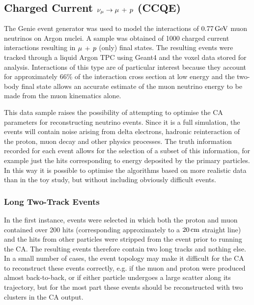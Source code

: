 \subsection{Charged Current \texorpdfstring{$\nu_\mu \rightarrow \mu\,+\,p$}{ν\_μ → μ + p} (CCQE)}
The Genie event generator was used to model the interactions of $0.77\,\mathrm{GeV}$ muon neutrinos on Argon nuclei. A sample was obtained of 1000 charged current interactions resulting in $\mu\,+\,p$ (only) final states. The resulting events were tracked through a liquid Argon TPC using Geant4 and the voxel data stored for analysis. Interactions of this type are of particular interest because they account for approximately 66\% of the interaction cross section at low energy and the two-body final state allows an accurate estimate of the muon neutrino energy to be made from the muon kinematics alone.

This data sample raises the possibility of attempting to optimise the \ac{CA} parameters for reconstructing neutrino events. Since it is a full simulation, the events will contain noise arising from delta electrons, hadronic reinteraction of the proton, muon decay and other physics processes. The truth information recorded for each event allows for the selection of a subset of this information, for example just the hits corresponding to energy deposited by the primary particles. In this way it is possible to optimise the algorithms based on more realistic data than in the toy study, but without including obviously difficult events.

\subsubsection{Long Two-Track Events}\label{sec:long_two_track_events}
In the first instance, events were selected in which both the proton and muon contained over 200 hits (corresponding approximately to a $20\,\mathrm{cm}$ straight line) and the hits from other particles were stripped from the event prior to running the \ac{CA}. The resulting events therefore contain two long tracks and nothing else. In a small number of cases, the event topology may make it difficult for the \ac{CA} to reconstruct these events correctly, e.g. if the muon and proton were produced almost back-to-back, or if either particle undergoes a large scatter along its trajectory, but for the most part these events should be reconstructed with two clusters in the \ac{CA} output.

